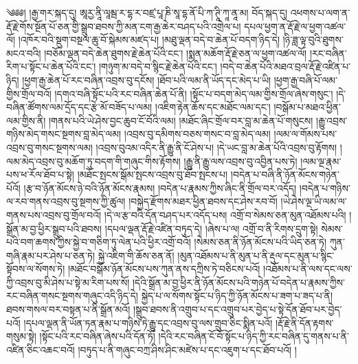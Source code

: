 ༄༅༅། །རྒྱ་གར་སྐད་དུ། ཨཱརྱ་ནཱི་ལཱམྦ་ར་དྷ་ར་བཛྲ་པཱ་ཎི་སཱ་དྷ་ནོ་པི་ཀ་ཊཱི་ཀཱ་ནཱ་མ། བོད་སྐད་དུ། འཕགས་པ་ལག་ན་རྡོ་རྗེ་གོས་སྔོན་པོ་ཅན་གྱི་སྒྲུབ་ཐབས་ཀྱི་མན་ངག་རྒྱ་ཆེར་བཤད་པའི་འགྲེལ་པ། དཔལ་ཕྱག་ན་རྡོ་རྗེ་ལ་ཕྱག་འཚལ་ལོ། །འཁོར་བའི་སྡུག་བསྔལ་ཆུ་བོ་སྐེམས་མཛད་པ། །མཐུ་ལྡན་བདེ་བ་ཆེན་པོ་བདག་ཉིད་དེ། །ཉི་ཟླ་ལྟ་བུའི་ཐུགས་མངའ་བའི། །བཅོམ་ལྡན་བདེ་ཆེན་ཐུགས་རྗེ་ཆེན་པོའི་ངང་། །སྨན་མཆོག་རྡོ་རྗེ་ཅན་ལ་ཕྱག་འཚལ་ལོ། །རང་བཞིན་རིག་པ་སྟོང་པ་ཆེན་པོའི་ངང་། །གཉུག་མ་བདེ་བ་སྙིང་རྗེ་ཆེན་པོའི་ངང་། །བདེ་བ་ཆེན་པོའི་མཐའ་བྲལ་རྡོ་རྗེ་འཛིན་པ་ཉིད། །ཕྱག་རྒྱ་ཆེན་པོ་རང་བཞིན་འབྲས་བུ་དངོས། །ཐོབ་པའི་ལམ་ནི་ཡོད་དང་མེད་པ་ཡི། །ཕྱག་རྒྱ་བཞི་པོ་ལམ་གྱིས་གྲོལ་བའོ། །དགའ་བཞི་སྟོང་པའི་རང་བཞིན་ཆེན་པོ་ནི། །སྟོང་པ་བདག་མེད་ལམ་གྱིས་གྲོལ་ཞེས་གསུང་། །དེ་བཞིན་ཚོགས་ལམ་དྲོད་དང་རྩེ་མོ་བཟོད་པ་ལམ། །འཇིག་རྟེན་ཆོས་དང་མཐོང་ལམ་དང་། །བསྒོམ་པ་མཐའ་ཕྱིན་ལམ་གྱིས་ནི། །གནས་པའི་ཡེ་ཤེས་བྱང་ཆུབ་ངོ་བོའི་ལམ། །མཐོང་ཞིང་གྲོལ་བར་བླ་མ་ཆེན་པོ་གསུངས། །རྒྱུ་འབྲས་གཉིས་མེད་གསང་སྔགས་བླ་མེད་ལམ། །འབྲས་བུ་དམིགས་བཅས་གསང་བ་བླ་མེད་ལམ། །ལམ་ལ་གོམས་པས་འབྲས་བུ་གསང་སྔགས་ལམ། །འབྲས་བུའམ་འདིར་ནི་རྒྱུ་ནི་ངོ་ཤེས་པ། །དེ་ཡང་བླ་མ་ཆེན་པོའི་འབྲས་བུ་རྟོགས། །ལམ་མེད་འབྲས་བུ་མཆོག་ཏུ་བདག་གི་གཞུང་གིས་རྟོགས། །རྒྱུ་ནི་རྒྱུ་ལས་འབྲས་བུ་འབྱིན་པས་ཏེ། །ལམ་ལྔ་རྣམ་པས་ཕ་རོལ་ཐོབ་པ་སྟེ། །མཐོང་སྤངས་སྒོམ་སྤངས་འབྲས་བུ་ཐོབ་སྤངས་པ། །བདེན་པ་བཞི་ནི་ཉོན་མོངས་གཉེན་པོའོ། །རྩ་བ་ཉོན་མོངས་ཉེ་བའི་ཉོན་མོངས་རྣམས། །བདེན་པ་རྣམས་ཀྱིས་ཞིང་ནི་གྲོལ་བར་འདོད། །བདེན་པ་གཉིས་ལ་རབ་གནས་འབྲས་བུ་སྔགས་ཀྱི་ཚུལ། །བསྐྱེད་རྫོགས་མཐར་ཕྱིན་ཐབས་དང་ཤེས་རབ་བོ། །ཡེ་ཤེས་ལྔ་ཡི་ལམ་ལ་གནས་པས་འབྲས་བུ་གྲོལ་བའོ། །དེ་ལ་རྩ་བའི་དོན་བཤད་པར་འདོད་པས། འགྲོ་བ་སེམས་ཅན་མུན་འཐོམས་པའི། །སྒྲོན་མ་བྱ་ཕྱིར་སྒྲུབ་པའི་ཐབས། །དཔལ་ལྡན་རྡོ་རྗེ་འཛིན་བཏུད་དེ། །ཞེས་པ་ལ། འགྲོ་བ་ནི་རིགས་དྲུག་སྟེ། སེམས་པའི་བག་ཆགས་ཀྱིས་སྐྱེ་བ་གཅིག་ཏུ་ལེན་པའི་ཕྱིར་འགྲོ་བའོ། །སེམས་ཅན་ནི་ཉོན་མོངས་པའི་ཡིད་ཅན་ཏེ། ཀུན་གཞི་རྣམ་པར་ཤེས་པ་ཅན་ཏེ། སྐྱེ་འཇིག་གི་ཆོས་ཅན་ནོ། །མུན་འཐོམས་པ་ནི་མུན་པ་ནི་རྡུལ་དང་མུན་པ་སྙིང་སྟོབས་ལ་སོགས་ཏེ། །མཐོང་བསྒོམ་ཉོན་མོངས་པས་ཀུན་ནས་དཀྲིས་ཏེ་བཅིངས་པའོ། །འཐོམས་པ་ནི་ལས་དང་ལས་ཀྱི་འབྲས་བུ་མི་ཤེས་པ་སྟེ་མ་རིག་པས་སོ། །དེའི་སྒྲོན་མ་བྱ་ཕྱིར་ནི་ཉོན་མོངས་པའི་གཉེན་པོ་བདེན་པ་རྣམས་ཀྱིས་རང་བཞིན་གསང་སྔགས་གཞུང་འདི་ཉིད་དེ། སྐྱེད་པ་ལ་སོགས་སྟོང་པ་ཉིད་ཀྱི་ཉོན་མོངས་པ་ཟག་པ་ཟད་པ་ནི། ཐབས་གསལ་བར་བསྟན་པ་ནི་སྒྲོན་མའོ། །སྒྲུབ་ཐབས་ནི་འགྲུབ་པ་དང་འགྲུབ་པར་བྱེད་པ་སྟེ་དོན་ཐོབ་པར་བྱེད་པའོ། །དཔལ་ལྡན་ནི་ཡོན་ཏན་རྣམ་པ་གཉིས་ཏེ་རྒྱུ་དང་འབྲས་བུ་ལས་གྲུབ་ཅིང་སྨིན་པའོ། །རྡོ་རྗེ་ནི་དོན་རྟགས་གསུམ་སྟེ། །སྟོང་པའི་རང་བཞིན་ཞེས་པའི་དོན་ཏོ། །དེའི་རང་བཞིན་ངོ་བོ་སྟོང་པ་ཉིད་ཀྱི་རང་བཞིན་དུ་གནས་པ་ནི་འཛིན་ཅིང་འཆང་བའོ། །བཏུད་པ་ནི་གཞུང་བཀྲ་ཤིས་ཤིང་མཛེས་པ་དང་འཇུག་པ་དང་ཐོབ་པའོ། །
